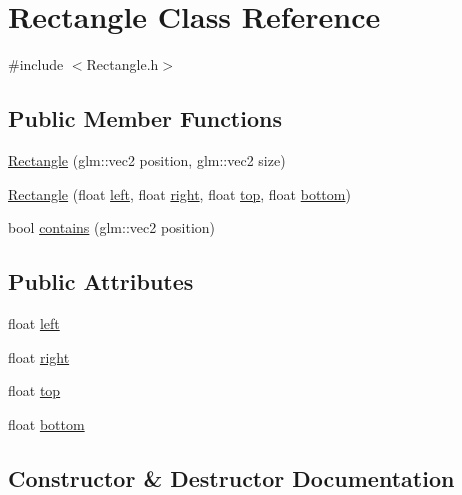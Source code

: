 \hypertarget{class_rectangle}{}\section{Rectangle Class Reference}
\label{class_rectangle}


{\ttfamily \#include $<$Rectangle.\+h$>$}

\subsection*{Public Member Functions}
\begin{DoxyCompactItemize}
\item 
\hyperlink{class_rectangle_ab0e8ec592a58e0540752eb6295bd7b94}{Rectangle} (glm\+::vec2 position, glm\+::vec2 size)
\item 
\hyperlink{class_rectangle_a09e01909856e5d550a34e6866e91a7c5}{Rectangle} (float \hyperlink{class_rectangle_a5e59c0573284f368da58bb94af7effc2}{left}, float \hyperlink{class_rectangle_a793506c993149cfefa11840014fb4039}{right}, float \hyperlink{class_rectangle_a87a5fabfb34ee12b61f58f9fcd8a32d3}{top}, float \hyperlink{class_rectangle_a9b18ca2e2e8d9b333309d55c6e804b20}{bottom})
\item 
bool \hyperlink{class_rectangle_a8100e6cf7e61c5a72b91a29b5c8f2182}{contains} (glm\+::vec2 position)
\end{DoxyCompactItemize}
\subsection*{Public Attributes}
\begin{DoxyCompactItemize}
\item 
float \hyperlink{class_rectangle_a5e59c0573284f368da58bb94af7effc2}{left}
\item 
float \hyperlink{class_rectangle_a793506c993149cfefa11840014fb4039}{right}
\item 
float \hyperlink{class_rectangle_a87a5fabfb34ee12b61f58f9fcd8a32d3}{top}
\item 
float \hyperlink{class_rectangle_a9b18ca2e2e8d9b333309d55c6e804b20}{bottom}
\end{DoxyCompactItemize}


\subsection{Constructor \& Destructor Documentation}
\mbox{\label{class_rectangle_ab0e8ec592a58e0540752eb6295bd7b94}} 
